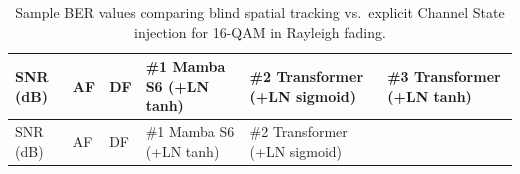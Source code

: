 \begin{longtable}[]{@{}
  >{\raggedright\arraybackslash}p{}
  >{\raggedright\arraybackslash}p{}
  >{\raggedright\arraybackslash}p{}
  >{\raggedright\arraybackslash}p{}
  >{\raggedright\arraybackslash}p{}
  >{\raggedright\arraybackslash}p{}@{}}
\caption{Sample BER values comparing blind spatial tracking vs.~explicit Channel State injection for 16-QAM in Rayleigh fading.}\label{tbl:table18}\tabularnewline
\toprule\noalign{}
\begin{minipage}[b]{\linewidth}\raggedright
SNR (dB)
\end{minipage} & \begin{minipage}[b]{\linewidth}\raggedright
AF
\end{minipage} & \begin{minipage}[b]{\linewidth}\raggedright
DF
\end{minipage} & \begin{minipage}[b]{\linewidth}\raggedright
\#1 Mamba S6 (+LN tanh)
\end{minipage} & \begin{minipage}[b]{\linewidth}\raggedright
\#2 Transformer (+LN sigmoid)
\end{minipage} & \begin{minipage}[b]{\linewidth}\raggedright
\#3 Transformer (+LN tanh)
\end{minipage} \\
\midrule\noalign{}
\endfirsthead
\toprule\noalign{}
\begin{minipage}[b]{\linewidth}\raggedright
SNR (dB)
\end{minipage} & \begin{minipage}[b]{\linewidth}\raggedright
AF
\end{minipage} & \begin{minipage}[b]{\linewidth}\raggedright
DF
\end{minipage} & \begin{minipage}[b]{\linewidth}\raggedright
\#1 Mamba S6 (+LN tanh)
\end{minipage} & \begin{minipage}[b]{\linewidth}\raggedright
\#2 Transformer (+LN sigmoid)
\end{minipage} & \begin{minipage}[b]{\linewidth}\raggedright

\end{minipage}
\end{longtable}
